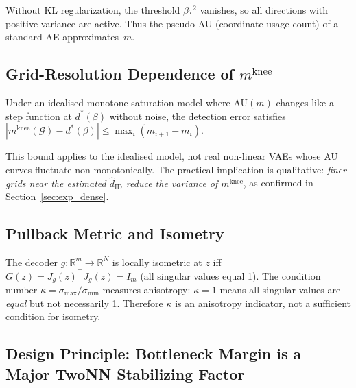 \documentclass[make,article,submit,pdftex,moreauthors]{Definitions/mdpi}
\newcommand{\Jg}{J_g}
\newcommand{\R}{\mathbb{R}}
\newcommand{\kap}{\kappa}
\newcommand{\mknee}{m^{\mathrm{knee}}}
\newcommand{\hatdID}{\hat{d}_{\mathrm{ID}}}
\begin{document}
\begin{remark}[Vanilla AE corresponds to $\beta=0$]
Without KL regularization, the threshold $\beta\tau^2$ vanishes, so all
directions with positive variance are active.  Thus the pseudo-AU
(coordinate-usage count) of a standard AE approximates~$m$.
\end{remark}

\subsection{\texorpdfstring{Grid-Resolution Dependence of $\mknee$}{Grid-Resolution Dependence of m\_knee}}\label{sec:theory_grid}

\begin{proposition}\label{thm:mknee_instab}
Under an idealised monotone-saturation model where AU$(m)$ changes like a step
function at $d^*(\beta)$ without noise, the detection error satisfies
$|\mknee(\mathcal{G})-d^*(\beta)|\leq\max_i(m_{i+1}-m_i)$.
\end{proposition}

\begin{remark}
This bound applies to the idealised model, not real non-linear VAEs whose AU
curves fluctuate non-monotonically.
The practical implication is qualitative: \emph{finer grids near the estimated
$\hatdID$ reduce the variance of $\mknee$}, as confirmed in Section~\ref{sec:exp_dense}.
\end{remark}

\subsection{Pullback Metric and Isometry}\label{sec:theory_pullback}

\begin{proposition}\label{thm:pullback}
The decoder $g:\R^m\!\to\R^N$ is locally isometric at $z$ iff
$G(z)=\Jg(z)^\top\Jg(z)=I_m$ (all singular values equal 1).
The condition number $\kap=\sigma_{\max}/\sigma_{\min}$ measures anisotropy:
$\kap=1$ means all singular values are \emph{equal} but not necessarily 1.
Therefore $\kap$ is an anisotropy indicator, not a sufficient condition for isometry.
\end{proposition}

\subsection{Design Principle: Bottleneck Margin is a Major TwoNN Stabilizing Factor}
\label{sec:theory_dp}
\end{document}
